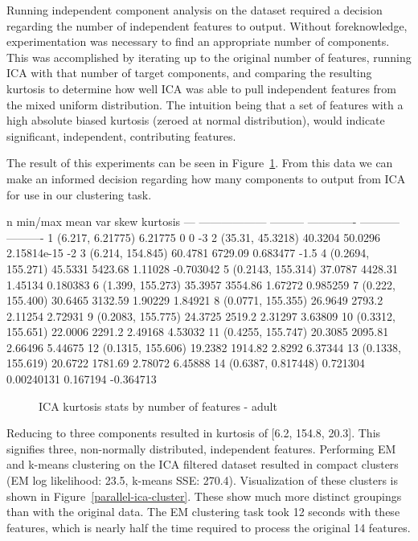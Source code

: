 \documentclass{sig-alternate}
\begin{document}
Running independent component analysis on the dataset required a decision regarding the number of independent features to output. Without foreknowledge, experimentation was necessary to find an appropriate number of components. This was accomplished by iterating up to the original number of features, running ICA with that number of target components, and comparing the resulting kurtosis to determine how well ICA was able to pull independent features from the mixed uniform distribution. The intuition being that a set of features with a high absolute biased kurtosis (zeroed at normal distribution), would indicate significant, independent, contributing features.

The result of this experiments can be seen in Figure~\ref{ica-stats-adult}. From this data we can make an informed decision regarding how many components to output from ICA for use in our clustering task. 

\tiny
\begin{verbbox}
  n  min/max                  mean            var         skew    kurtosis
---  ------------------  ---------  -------------  -----------  ----------
  1  (6.217, 6.21775)     6.21775      0           0             -3
  2  (35.31, 45.3218)    40.3204      50.0296      2.15814e-15   -2
  3  (6.214, 154.845)    60.4781    6729.09        0.683477      -1.5
  4  (0.2694, 155.271)   45.5331    5423.68        1.11028       -0.703042
  5  (0.2143, 155.314)   37.0787    4428.31        1.45134        0.180383
  6  (1.399, 155.273)    35.3957    3554.86        1.67272        0.985259
  7  (0.222, 155.400)    30.6465    3132.59        1.90229        1.84921
  8  (0.0771, 155.355)   26.9649    2793.2         2.11254        2.72931
  9  (0.2083, 155.775)   24.3725    2519.2         2.31297        3.63809
 10  (0.3312, 155.651)   22.0006    2291.2         2.49168        4.53032
 11  (0.4255, 155.747)   20.3085    2095.81        2.66496        5.44675
 12  (0.1315, 155.606)   19.2382    1914.82        2.8292         6.37344
 13  (0.1338, 155.619)   20.6722    1781.69        2.78072        6.45888
 14  (0.6387, 0.817448)   0.721304     0.00240131  0.167194      -0.364713
\end{verbbox}
\normalsize

\begin{figure}[!htbp]
    \centering
    \theverbbox
    \caption{ICA kurtosis stats by number of features - adult\label{ica-stats-adult}}
\end{figure}

Reducing to three components resulted in kurtosis of [6.2, 154.8, 20.3]. This signifies three, non-normally distributed, independent features. Performing EM and k-means clustering on the ICA filtered dataset resulted in compact clusters (EM log likelihood: 23.5, k-means SSE: 270.4). Visualization of these clusters is shown in Figure~\ref{parallel-ica-cluster}. These show much more distinct groupings than with the original data. The EM clustering task took 12 seconds with these features, which is nearly half the time required to process the original 14 features.
\end{document}
